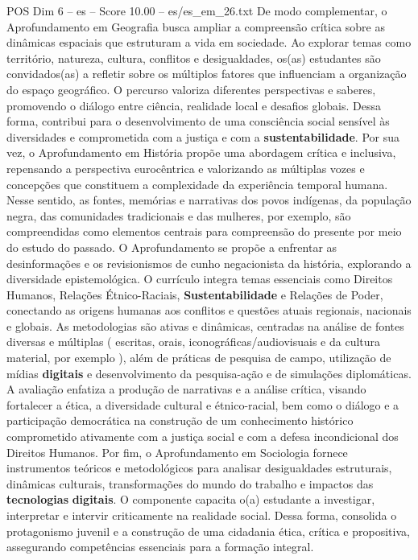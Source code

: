 \begin{textsample}{POS Dim 6 – es – Score 10.00 – es/es\_em\_26.txt}
De modo complementar, o Aprofundamento em Geografia busca ampliar a compreensão crítica sobre as dinâmicas espaciais que estruturam a vida em sociedade.
Ao explorar temas como território, natureza, cultura, conflitos e desigualdades, os(as) estudantes são convidados(as) a refletir sobre os múltiplos fatores que influenciam a organização do espaço geográfico.
O percurso valoriza diferentes perspectivas e saberes, promovendo o diálogo entre ciência, realidade local e desafios globais.
Dessa forma, contribui para o desenvolvimento de uma consciência social sensível às diversidades e comprometida com a justiça e com a \textbf{sustentabilidade}.
Por sua vez, o Aprofundamento em História propõe uma abordagem crítica e inclusiva, repensando a perspectiva eurocêntrica e valorizando as múltiplas vozes e concepções que constituem a complexidade da experiência temporal humana.
Nesse sentido, as fontes, memórias e narrativas dos povos indígenas, da população negra, das comunidades tradicionais e das mulheres, por exemplo, são compreendidas como elementos centrais para compreensão do presente por meio do estudo do passado.
O Aprofundamento se propõe a enfrentar as desinformações e os revisionismos de cunho negacionista da história, explorando a diversidade epistemológica.
O currículo integra temas essenciais como Direitos Humanos, Relações Étnico-Raciais, \textbf{Sustentabilidade} e Relações de Poder, conectando as origens humanas aos conflitos e questões atuais regionais, nacionais e globais.
As metodologias são ativas e dinâmicas, centradas na análise de fontes diversas e múltiplas ( escritas, orais, iconográficas/audiovisuais e da cultura material, por exemplo ), além de práticas de pesquisa de campo, utilização de mídias \textbf{digitais} e desenvolvimento da pesquisa-ação e de simulações diplomáticas.
A avaliação enfatiza a produção de narrativas e a análise crítica, visando fortalecer a ética, a diversidade cultural e étnico-racial, bem como o diálogo e a participação democrática na construção de um conhecimento histórico comprometido ativamente com a justiça social e com a defesa incondicional dos Direitos Humanos.
Por fim, o Aprofundamento em Sociologia fornece instrumentos teóricos e metodológicos para analisar desigualdades estruturais, dinâmicas culturais, transformações do mundo do trabalho e impactos das \textbf{tecnologias} \textbf{digitais}.
O componente capacita o(a) estudante a investigar, interpretar e intervir criticamente na realidade social.
Dessa forma, consolida o protagonismo juvenil e a construção de uma cidadania ética, crítica e propositiva, assegurando competências essenciais para a formação integral.

\end{textsample}
